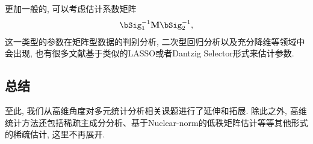 更加一般的, 可以考虑估计系数矩阵
\begin{align*}
    \bSig_1^{-1} \M \bSig_2^{-1},
\end{align*}
这一类型的参数在矩阵型数据的判别分析, 二次型回归分析以及充分降维等领域中会出现, 也有很多文献基于类似的LASSO或者Dantzig Selector形式来估计参数.

\subsection{总结}
至此, 我们从高维角度对多元统计分析相关课题进行了延伸和拓展. 除此之外, 高维统计方法还包括稀疏主成分分析、基于Nuclear-norm的低秩矩阵估计等等其他形式的稀疏估计, 这里不再展开.


